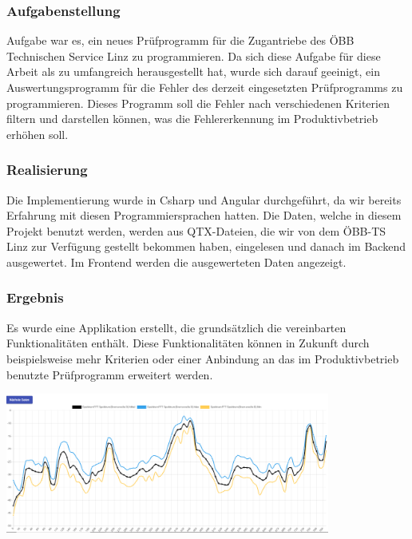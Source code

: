 \subsubsection{Aufgabenstellung}
Aufgabe war es, ein neues Prüfprogramm für die Zugantriebe des ÖBB Technischen Service Linz zu programmieren. Da sich diese Aufgabe 
für diese Arbeit als zu umfangreich herausgestellt hat, wurde sich darauf geeinigt, ein Auswertungsprogramm für die Fehler des derzeit
eingesetzten Prüfprogramms zu programmieren. Dieses Programm soll die Fehler nach verschiedenen Kriterien filtern und darstellen
können, was die Fehlererkennung im Produktivbetrieb erhöhen soll.
\subsubsection{Realisierung}
Die Implementierung wurde in Csharp und Angular durchgeführt, da wir bereits Erfahrung mit diesen Programmiersprachen hatten. Die Daten, 
welche in diesem Projekt benutzt werden, werden aus QTX-Dateien, die wir von dem ÖBB-TS Linz zur Verfügung gestellt bekommen haben,
eingelesen und danach im Backend ausgewertet. Im Frontend werden die ausgewerteten Daten angezeigt.
\subsubsection{Ergebnis}
Es wurde eine Applikation erstellt, die grundsätzlich die vereinbarten Funktionalitäten enthält. Diese Funktionalitäten können in
Zukunft durch beispielsweise mehr Kriterien oder einer Anbindung an das im Produktivbetrieb benutzte Prüfprogramm erweitert werden.
\begin{center}
  \includegraphics[width=0.8\textwidth]{pics/graphwok.PNG}
\end{center}
